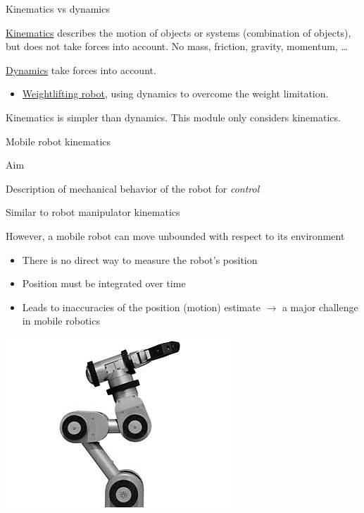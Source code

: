 \documentclass[compress]{beamer}
\begin{document}
\begin{frame}{Kinematics vs dynamics}

\href{http://en.wikipedia.org/wiki/Kinematics}{Kinematics} describes the
motion of objects or systems (combination of objects), but does not take
forces into account. No mass, friction, gravity, momentum, \ldots{}

\href{http://en.wikipedia.org/wiki/Analytical_dynamics}{Dynamics} take
forces into account.

\begin{itemize}
    \item \href{http://www.youtube.com/watch?v=kEed8DVO21I}{Weightlifting
  robot}, using dynamics to overcome the weight limitation.
\end{itemize}

Kinematics is simpler than dynamics. This module only considers
kinematics.

\end{frame}

\begin{frame}{Mobile robot kinematics}

Aim

Description of mechanical behavior of the robot for \emph{control}

Similar to robot manipulator kinematics

However, a mobile robot can move unbounded with respect to its
environment

\begin{itemize}
    \item There is no direct way to measure the robot's position
    \item Position must be integrated over time
    \item Leads to inaccuracies of the position (motion) estimate
    $\rightarrow$ a major challenge in mobile robotics
\end{itemize}

    \begin{center}
        \includegraphics[width=0.8\linewidth]{kinematics_ex1}
    \end{center}

\end{frame}
\end{document}
